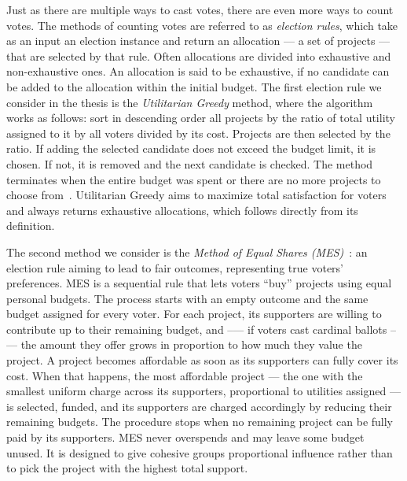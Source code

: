 Just as there are multiple ways to cast votes, there are even more ways to count votes. The methods of counting votes are referred to as \emph{election rules}, which take as an input an election instance and return an allocation --- a set of projects ---  that are selected by that rule. Often allocations are divided into exhaustive and non-exhaustive ones. An allocation is said to be exhaustive, if no candidate can be added to the allocation within the initial budget. The first election rule we consider in the thesis is the \emph{Utilitarian Greedy} method, where the algorithm works as follows: sort in descending order all projects by the ratio of total utility assigned to it by all voters divided by its cost. Projects are then selected by the ratio. If adding the selected candidate does not exceed the budget limit, it is chosen. If not, it is removed and the next candidate is checked. The method terminates when the entire budget was spent or there are no more projects to choose from~\cite{DataToolsAndPB}. Utilitarian Greedy aims to maximize total satisfaction for voters and always returns exhaustive allocations, which follows directly from its definition.

The second method we consider is the \emph{Method of Equal Shares (MES)}~\cite{EqualShares}: an election rule aiming to lead to fair outcomes, representing true voters' preferences. MES is a sequential rule that lets voters “buy” projects using equal personal budgets. The process starts with an empty outcome and the same budget assigned for every voter. For each project, its supporters are willing to contribute up to their remaining budget, and --— if voters cast cardinal ballots --— the amount they offer grows in proportion to how much they value the project. A project becomes affordable as soon as its supporters can fully cover its cost. When that happens, the most affordable project --- the one with the smallest uniform charge across its supporters, proportional to utilities assigned --- is selected, funded, and its supporters are charged accordingly by reducing their remaining budgets. The procedure stops when no remaining project can be fully paid by its supporters. MES never overspends and may leave some budget unused. It is designed to give cohesive groups proportional influence rather than to pick the project with the highest total support.


